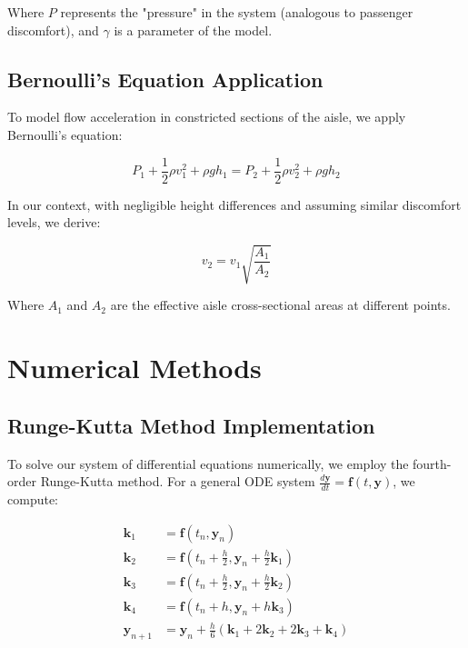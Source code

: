 \documentclass[a4paper,12pt]{article}
\begin{document}
Where $P$ represents the "pressure" in the system (analogous to passenger discomfort), and $\gamma$ is a parameter of the model.

\subsection{Bernoulli's Equation Application}

To model flow acceleration in constricted sections of the aisle, we apply Bernoulli's equation:

\begin{equation}
P_1 + \frac{1}{2}\rho v_1^2 + \rho g h_1 = P_2 + \frac{1}{2}\rho v_2^2 + \rho g h_2
\end{equation}

In our context, with negligible height differences and assuming similar discomfort levels, we derive:

\begin{equation}
v_2 = v_1\sqrt{\frac{A_1}{A_2}}
\end{equation}

Where $A_1$ and $A_2$ are the effective aisle cross-sectional areas at different points.

\section{Numerical Methods}

\subsection{Runge-Kutta Method Implementation}

To solve our system of differential equations numerically, we employ the fourth-order Runge-Kutta method. For a general ODE system $\frac{d\mathbf{y}}{dt} = \mathbf{f}(t, \mathbf{y})$, we compute:

\begin{align}
\mathbf{k}_1 &= \mathbf{f}(t_n, \mathbf{y}_n) \\
\mathbf{k}_2 &= \mathbf{f}(t_n + \frac{h}{2}, \mathbf{y}_n + \frac{h}{2}\mathbf{k}_1) \\
\mathbf{k}_3 &= \mathbf{f}(t_n + \frac{h}{2}, \mathbf{y}_n + \frac{h}{2}\mathbf{k}_2) \\
\mathbf{k}_4 &= \mathbf{f}(t_n + h, \mathbf{y}_n + h\mathbf{k}_3) \\
\mathbf{y}_{n+1} &= \mathbf{y}_n + \frac{h}{6}(\mathbf{k}_1 + 2\mathbf{k}_2 + 2\mathbf{k}_3 + \mathbf{k}_4)
\end{align}
\end{document}
